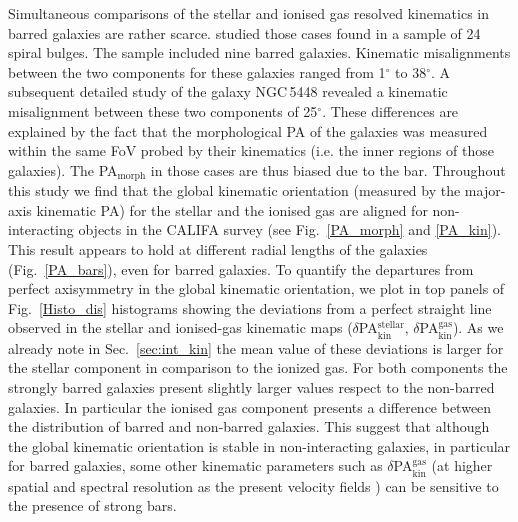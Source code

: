 \documentclass[longauth,traditabstract]{aa}
\begin{document}
Simultaneous comparisons of the stellar and ionised gas resolved kinematics in
barred galaxies are rather scarce. \cite{2006MNRAS.369..529F} studied those
cases found in a sample of 24 spiral bulges. The sample included nine barred
galaxies. Kinematic misalignments between the two components for these galaxies
ranged from 1$^{\circ}$ to 38$^{\circ}$. A subsequent detailed study of the galaxy
NGC\,5448 \citep{2005MNRAS.364..773F} revealed a kinematic misalignment between
these two components of 25$^{\circ}$. These differences are explained by the fact
that the morphological PA of the galaxies was measured within the same FoV
probed by their kinematics (i.e. the inner regions of those galaxies). The
PA$\mathrm{_{morph}}$ in those cases are thus biased due to the bar.
Throughout this study we find that the global kinematic orientation (measured by
the major-axis kinematic PA) for the stellar and the ionised gas are aligned for
non-interacting objects in the CALIFA survey (see Fig.~\ref{PA_morph} and
\ref{PA_kin}). This result appears to hold at different radial lengths of the 
galaxies (Fig.~\ref{PA_bars}), even for barred galaxies. To quantify the departures from perfect axisymmetry in the global kinematic orientation, we plot in top panels of Fig.~\ref{Histo_dis} histograms showing the deviations from a perfect straight line observed in the stellar and ionised-gas kinematic maps ($\delta$PA$_{\mathrm{kin}}^{\mathrm{stellar}}$, $\delta$PA$_{\mathrm{kin}}^{\mathrm{gas}}$). As we already note in Sec.~\ref{sec:int_kin} the mean value of these deviations is larger for the stellar component in comparison to the ionized gas. For both components the strongly barred galaxies present slightly larger values respect to the non-barred galaxies. In particular the ionised gas component presents a difference between the distribution of barred and non-barred galaxies. This suggest that although the global kinematic orientation is stable in non-interacting galaxies, in particular for barred galaxies, some other kinematic parameters such as $\delta$PA$_{\mathrm{kin}}^{\mathrm{gas}}$ (at higher spatial and spectral resolution as the present velocity fields ) can be sensitive to the presence of
strong bars. 
\end{document}
